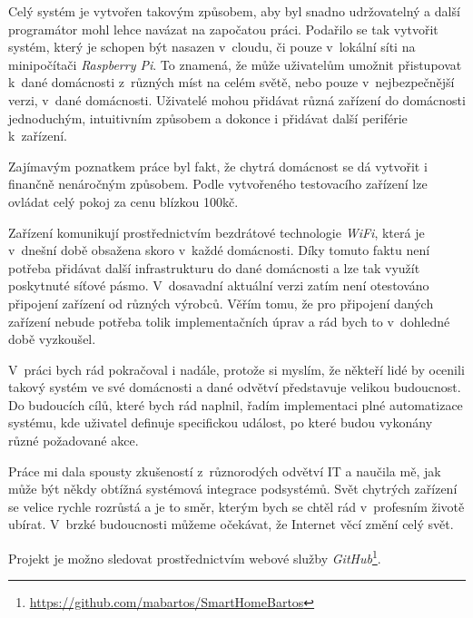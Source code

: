 Celý systém je vytvořen takovým způsobem, aby byl snadno udržovatelný a další programátor mohl lehce navázat na započatou práci.
Podařilo se tak vytvořit systém, který je schopen být nasazen v~cloudu, či pouze v~lokální síti na minipočítači \emph{Raspberry Pi}.
To znamená, že může uživatelům umožnit přistupovat k~dané domácnosti z~různých míst na celém světě, nebo pouze v~nejbezpečnější verzi, v~dané domácnosti.
Uživatelé mohou přidávat různá zařízení do domácnosti jednoduchým, intuitivním způsobem a dokonce i přidávat další periférie k~zařízení.

Zajímavým poznatkem práce byl fakt, že chytrá domácnost se dá vytvořit i finančně nenáročným způsobem.
Podle vytvořeného testovacího zařízení lze ovládat celý pokoj za cenu blízkou 100kč.

Zařízení komunikují prostřednictvím bezdrátové technologie \emph{WiFi}, která je v~dnešní době obsažena skoro v~každé domácnosti.
Díky tomuto faktu není potřeba přidávat další infrastrukturu do dané domácnosti a lze tak využít poskytnuté síťové pásmo.
V~dosavadní aktuální verzi zatím není otestováno připojení zařízení od různých výrobců.
Věřím tomu, že pro připojení daných zařízení nebude potřeba tolik implementačních úprav a rád bych to v~dohledné době vyzkoušel.

V~práci bych rád pokračoval i nadále, protože si myslím, že někteří lidé by ocenili takový systém ve své domácnosti a dané odvětví představuje velikou budoucnost.
Do budoucích cílů, které bych rád naplnil, řadím implementaci plné automatizace systému, kde uživatel definuje specifickou událost, po které budou vykonány různé požadované akce.

Práce mi dala spousty zkušeností z~různorodých odvětví IT a naučila mě, jak může být někdy obtížná systémová integrace podsystémů.
Svět chytrých zařízení se velice rychle rozrůstá a je to směr, kterým bych se chtěl rád v~profesním životě ubírat.
V~brzké budoucnosti můžeme očekávat, že Internet věcí změní celý svět.

Projekt je možno sledovat prostřednictvím webové služby \emph{GitHub}\footnote{\url{https://github.com/mabartos/SmartHomeBartos}}.
